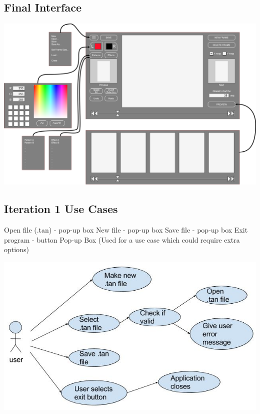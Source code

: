 \documentclass[12pt]{article}
\begin{document}
\subsection*{Final Interface}
\includegraphics[scale=.19]{CS336-Project01-UI.png}
\subsection*{Iteration 1 Use Cases}
Open file (.tan) - pop-up box
New file - pop-up box
Save file - pop-up box
Exit program - button
Pop-up Box (Used for a use case which could require extra options)\par
\noindent
\includegraphics[scale=.82]{UseCases.JPG}
\end{document}
